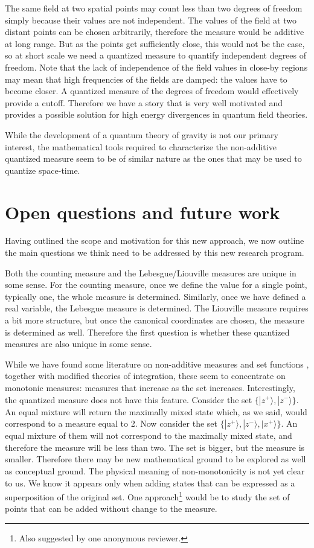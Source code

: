 \documentclass[entropy,article,submit,pdftex,moreauthors]{Definitions/mdpi}
\def\>{\rangle}
\begin{document}
The same field at two spatial points may count less than two degrees of freedom simply because their values are not independent. The values of the field at two distant points can be chosen arbitrarily, therefore the measure would be additive at long range. But as the points get sufficiently close, this would not be the case, so at short scale we need a quantized measure to quantify independent degrees of freedom. Note that the lack of independence of the field values in close-by regions may mean that high frequencies of the fields are damped: the values have to become closer. A quantized measure of the degrees of freedom would effectively provide a cutoff. Therefore we have a story that is very well motivated and provides a possible solution for high energy divergences in quantum field theories.

While the development of a quantum theory of gravity is not our primary interest, the mathematical tools required to characterize the non-additive quantized measure seem to be of similar nature as the ones that may be used to quantize space-time.

\section{Open questions and future work}

Having outlined the scope and motivation for this new approach, we now outline the main questions we think need to be addressed by this new research program.

Both the counting measure and the Lebesgue/Liouville measures are unique in some sense. For the counting measure, once we define the value for a single point, typically one, the whole measure is determined. Similarly, once we have defined a real variable, the Lebesgue measure is determined. The Liouville measure requires a bit more structure, but once the canonical coordinates are chosen, the measure is determined as well. Therefore the first question is whether these quantized measures are also unique in some sense.

While we have found some literature on non-additive measures and set functions \cite{hamhalter2003quantum, nonadditive2014}, together with modified theories of integration, these seem to concentrate on monotonic measures: measures that increase as the set increases. Interestingly, the quantized measure does not have this feature. Consider the set $\{ |z^+\>, |z^-\> \}$. An equal mixture will return the maximally mixed state which, as we said, would correspond to a measure equal to 2. Now consider the set $\{ |z^+\>, |z^-\>, |x^+\> \}$. An equal mixture of them will not correspond to the maximally mixed state, and therefore the measure will be less than two. The set is bigger, but the measure is smaller. Therefore there may be new mathematical ground to be explored as well as conceptual ground. The physical meaning of non-monotonicity is not yet clear to us. We know it appears only when adding states that can be expressed as a superposition of the original set. One approach\footnote{Also suggested by one anonymous reviewer.} would be to study the set of points that can be added without change to the measure.
\end{document}
